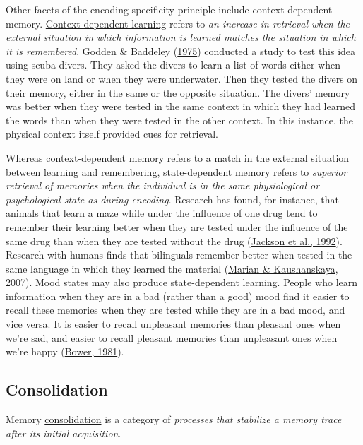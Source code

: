 \documentclass[
]{krantz}
\begin{document}
Other facets of the encoding specificity principle include context-dependent memory. \protect\hyperlink{context-dependent-learning}{Context-dependent learning} refers to \emph{an increase in retrieval when the external situation in which information is learned matches the situation in which it is remembered}. Godden \& Baddeley (\protect\hyperlink{ref-Godden1975}{1975}) conducted a study to test this idea using scuba divers. They asked the divers to learn a list of words either when they were on land or when they were underwater. Then they tested the divers on their memory, either in the same or the opposite situation. The divers' memory was better when they were tested in the same context in which they had learned the words than when they were tested in the other context. In this instance, the physical context itself provided cues for retrieval.

Whereas context-dependent memory refers to a match in the external situation between learning and remembering, \protect\hyperlink{state-dependent-memory}{state-dependent memory} refers to \emph{superior retrieval of memories when the individual is in the same physiological or psychological state as during encoding}. Research has found, for instance, that animals that learn a maze while under the influence of one drug tend to remember their learning better when they are tested under the influence of the same drug than when they are tested without the drug (\protect\hyperlink{ref-Jackson1992}{Jackson et al., 1992}). Research with humans finds that bilinguals remember better when tested in the same language in which they learned the material (\protect\hyperlink{ref-Marian2007}{Marian \& Kaushanskaya, 2007}). Mood states may also produce state-dependent learning. People who learn information when they are in a bad (rather than a good) mood find it easier to recall these memories when they are tested while they are in a bad mood, and vice versa. It is easier to recall unpleasant memories than pleasant ones when we're sad, and easier to recall pleasant memories than unpleasant ones when we're happy (\protect\hyperlink{ref-Bower1981}{Bower, 1981}).

\hypertarget{consolidation}{%
\subsection*{Consolidation}\label{consolidation}}


Memory \protect\hyperlink{consolidation}{consolidation} is a category of \emph{processes that stabilize a memory trace after its initial acquisition}.
\end{document}
